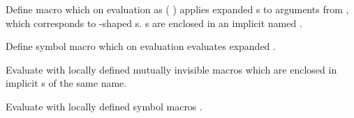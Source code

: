 \begin{LIST}{1cm}

  {
  Define macro  which on evaluation as (
  ) applies expanded s to arguments from
  , which corresponds to -shaped
  s. s are enclosed in an implicit
   named .
  }

  {
  Define symbol macro  which on evaluation evaluates
  expanded . 
  }

  {
  Evaluate  with locally defined mutually
  invisible macros  which are enclosed in implicit s
  of the same name.
  }

  {
  Evaluate  with locally defined symbol macros
  . 
  }


\end{LIST}
